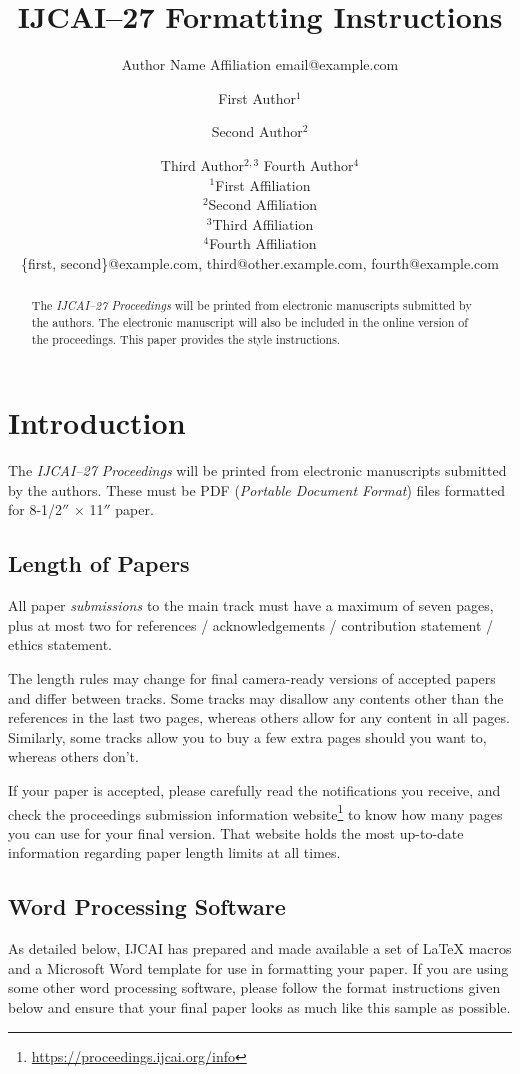 \documentclass{article}
\title{IJCAI--27 Formatting Instructions}
\author{
    Author Name
    \affiliations
    Affiliation
    \emails
    email@example.com
}
\author{
First Author$^1$
\and
Second Author$^2$\and
Third Author$^{2,3}$\And
Fourth Author$^4$\\
\affiliations
$^1$First Affiliation\\
$^2$Second Affiliation\\
$^3$Third Affiliation\\
$^4$Fourth Affiliation\\
\emails
\{first, second\}@example.com,
third@other.example.com,
fourth@example.com
}
\begin{document}
\maketitle

\begin{abstract}
    The {\it IJCAI--27 Proceedings} will be printed from electronic
    manuscripts submitted by the authors. The electronic manuscript will
    also be included in the online version of the proceedings. This paper
    provides the style instructions.
\end{abstract}

\section{Introduction}

The {\it IJCAI--27 Proceedings} will be printed from electronic
manuscripts submitted by the authors. These must be PDF ({\em Portable
        Document Format}) files formatted for 8-1/2$''$ $\times$ 11$''$ paper.

\subsection{Length of Papers}


All paper {\em submissions} to the main track must have a maximum of seven pages, plus at most two for references / acknowledgements / contribution statement / ethics statement.

The length rules may change for final camera-ready versions of accepted papers and
differ between tracks. Some tracks may disallow any contents other than the references in the last two pages, whereas others allow for any content in all pages. Similarly, some tracks allow you to buy a few extra pages should you want to, whereas others don't.

If your paper is accepted, please carefully read the notifications you receive, and check the proceedings submission information website\footnote{\url{https://proceedings.ijcai.org/info}} to know how many pages you can use for your final version. That website holds the most up-to-date information regarding paper length limits at all times.


\subsection{Word Processing Software}

As detailed below, IJCAI has prepared and made available a set of
\LaTeX{} macros and a Microsoft Word template for use in formatting
your paper. If you are using some other word processing software, please follow the format instructions given below and ensure that your final paper looks as much like this sample as possible.
\end{document}
